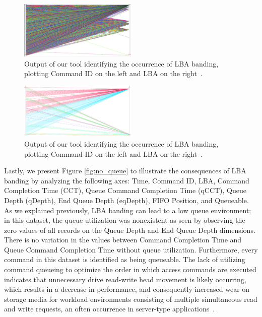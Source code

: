 \documentclass[journal]{vgtc}                %
\begin{document}
\begin{figure}[h!!]
 \centering
 \includegraphics[width=0.5\textwidth]{images/lba_banding_full.eps}
 \caption[Output of our tool identifying the occurrence of LBA banding.]{Output of our tool identifying the occurrence of LBA banding, plotting Command ID on the left and LBA on the right~\cite{internal:collab}.}
 \label{fig:lba_banding_full}
\end{figure}

\begin{figure}[h!!]
 \centering
 \includegraphics[width=0.5\textwidth]{images/11.eps}
 \caption[Output of our tool identifying the occurrence of LBA banding.]{Output of our tool identifying the occurrence of LBA banding, plotting Command ID on the left and LBA on the right~\cite{internal:collab}.}
 \label{fig:lba_banding}
\end{figure}

Lastly, we present Figure \ref{fig:no_queue} to illustrate the consequences of LBA banding by analyzing the following axes: Time, Command ID, LBA, Command Completion Time (CCT), Queue Command Completion Time (qCCT), Queue Depth (qDepth), End Queue Depth (eqDepth), FIFO Position, and Queueable. As we explained previously, LBA banding can lead to a low queue environment; in this dataset, the queue utilization was nonexistent as seen by observing the zero values of all records on the Queue Depth and End Queue Depth dimensions. There is no variation in the values between Command Completion Time and Queue Command Completion Time without queue utilization. Furthermore, every command in this dataset is identified as being queueable. The lack of utilizing command queueing to optimize the order in which access commands are executed indicates that unnecessary drive read-write head movement is likely occurring, which results in a decrease in performance, and consequently increased wear on storage media for workload environments consisting of multiple simultaneous read and write requests, an often occurrence in server-type applications~\cite{ncq:whitepaper}.
\end{document}
